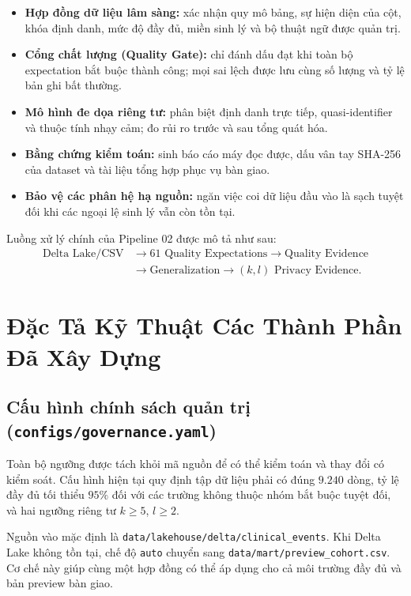 \documentclass[11pt,a4paper]{article}
\begin{document}
\begin{itemize}
    \item \textbf{Hợp đồng dữ liệu lâm sàng:} xác nhận quy mô bảng, sự hiện diện của cột, khóa định danh, mức độ đầy đủ, miền sinh lý và bộ thuật ngữ được quản trị.
    \item \textbf{Cổng chất lượng (Quality Gate):} chỉ đánh dấu đạt khi toàn bộ expectation bắt buộc thành công; mọi sai lệch được lưu cùng số lượng và tỷ lệ bản ghi bất thường.
    \item \textbf{Mô hình đe dọa riêng tư:} phân biệt định danh trực tiếp, quasi-identifier và thuộc tính nhạy cảm; đo rủi ro trước và sau tổng quát hóa.
    \item \textbf{Bằng chứng kiểm toán:} sinh báo cáo máy đọc được, dấu vân tay SHA-256 của dataset và tài liệu tổng hợp phục vụ bàn giao.
    \item \textbf{Bảo vệ các phân hệ hạ nguồn:} ngăn việc coi dữ liệu đầu vào là sạch tuyệt đối khi các ngoại lệ sinh lý vẫn còn tồn tại.
\end{itemize}

Luồng xử lý chính của Pipeline 02 được mô tả như sau:
\begin{align*}
\text{Delta Lake/CSV} &\longrightarrow \text{61 Quality Expectations}
\longrightarrow \text{Quality Evidence} \\
&\longrightarrow \text{Generalization}
\longrightarrow (k,l)\text{ Privacy Evidence}.
\end{align*}

\section{Đặc Tả Kỹ Thuật Các Thành Phần Đã Xây Dựng}

\subsection{Cấu hình chính sách quản trị (\texttt{configs/governance.yaml})}

Toàn bộ ngưỡng được tách khỏi mã nguồn để có thể kiểm toán và thay đổi có kiểm soát. Cấu hình hiện tại quy định tập dữ liệu phải có đúng $9.240$ dòng, tỷ lệ đầy đủ tối thiểu $95\%$ đối với các trường không thuộc nhóm bắt buộc tuyệt đối, và hai ngưỡng riêng tư $k\geq5$, $l\geq2$.

Nguồn vào mặc định là \texttt{data/lakehouse/delta/clinical\_events}. Khi Delta Lake không tồn tại, chế độ \texttt{auto} chuyển sang \texttt{data/mart/preview\_cohort.csv}. Cơ chế này giúp cùng một hợp đồng có thể áp dụng cho cả môi trường đầy đủ và bản preview bàn giao.
\end{document}
